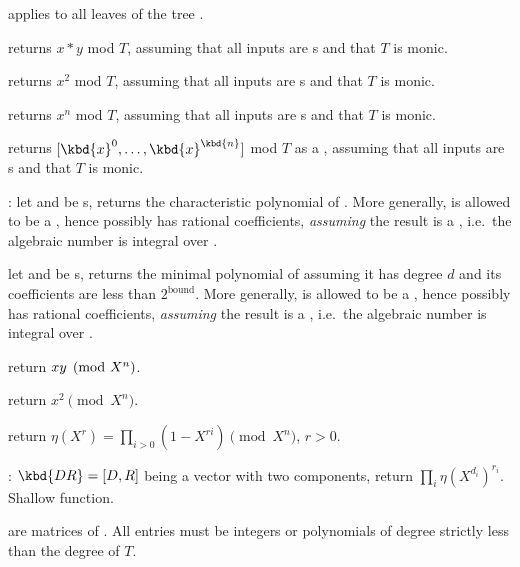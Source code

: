 
 applies  to all
leaves of the tree .


 returns $x*y$ mod $T$, assuming
that all inputs are s and that $T$ is monic.

 returns $x^2$ mod $T$, assuming
that all inputs are s and that $T$ is monic.

 returns $x^n$ mod $T$, assuming
that all inputs are s and that $T$ is monic.

 returns $[\kbd{x}^0,
\dots, \kbd{x}^\kbd{n}]$ mod $T$ as a , assuming that all inputs are
s and that $T$ is monic.

: let  and  be
s, returns the characteristic polynomial of .
More generally,  is allowed to be a , hence possibly has
rational coefficients, \emph{assuming} the result is a , i.e.~the
algebraic number  is integral over .

let  and  be
s, returns the minimal polynomial of  assuming it has
degree $d$ and its coefficients are less than $2^{\text{bound}}$.
More generally,  is allowed to be a , hence possibly has
rational coefficients, \emph{assuming} the result is a , i.e.~the
algebraic number  is integral over .


 return $x\*y\pmod{X^n}$.

 return $x^2\pmod{X^n}$.

 return $\eta(X^r) = \prod_{i>0} (1-X^{ri})
\pmod{X^n}$, $r > 0$.

: $\kbd{DR}= [D,R]$ being a vector
with two  components, return $\prod_i \eta(X^{d_i})^{r_i}$.
Shallow function.


 are matrices of . All entries must be integers or
polynomials of degree strictly less than the degree of $T$.

